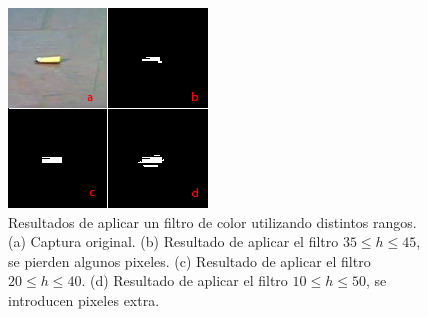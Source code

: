 \begin{figure}[tpb]
\begin{center}
  \includegraphics[scale=0.8]{vision/figures/hue.png}
\end{center}
  \caption[Filtro de color con distintos rangos]{\small Resultados de aplicar un filtro de color utilizando distintos rangos. (a) Captura original. (b) Resultado de aplicar el filtro $35\le h \le45$, se pierden algunos pixeles. (c) Resultado de aplicar el filtro $20\le h \le40$. (d) Resultado de aplicar el filtro $10 \le h \le 50$, se introducen pixeles extra.} 
  \label{fig:hue_range}
\end{figure}

